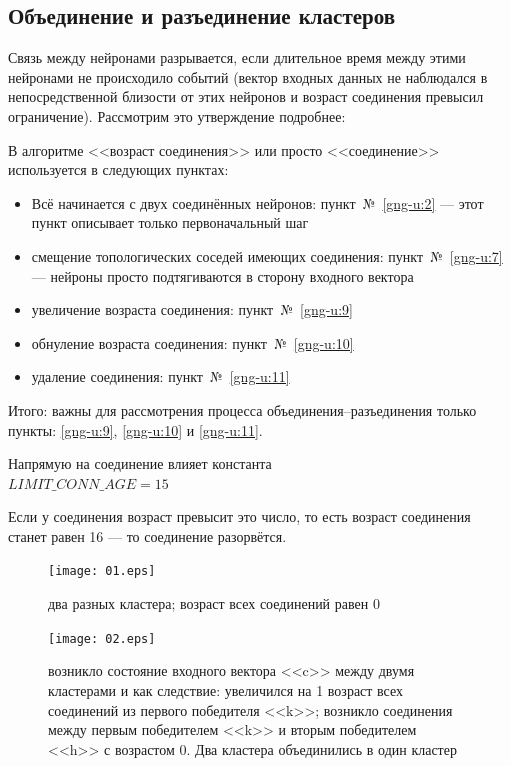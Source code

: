 \documentclass[unicode, 12pt, a4paper,oneside,fleqn]{article}
\begin{document}
\subsection{Объединение и разъединение кластеров}
Связь между нейронами разрывается, если длительное время между этими
нейронами не происходило событий (вектор входных данных не наблюдался
в непосредственной близости от этих нейронов и возраст соединения
превысил ограничение). Рассмотрим это утверждение подробнее:

В алгоритме <<возраст соединения>> или просто <<соединение>>
используется в следующих пунктах:
\begin{itemize}
\item Всё начинается с двух соединённых нейронов: пункт~№~\ref{gng-u:2} ---
  этот пункт описывает только первоначальный шаг
\item смещение топологических соседей имеющих соединения: пункт~№~\ref{gng-u:7}
  --- нейроны просто подтягиваются в сторону входного вектора
\item увеличение возраста соединения: пункт~№~\ref{gng-u:9}
\item обнуление возраста соединения: пункт~№~\ref{gng-u:10}
\item удаление соединения: пункт~№~\ref{gng-u:11}
\end{itemize}
Итого: важны для рассмотрения процесса объединения--разъединения
только пункты: \ref{gng-u:9}, \ref{gng-u:10} и \ref{gng-u:11}.

Напрямую на соединение влияет константа\\
$LIMIT\_CONN\_AGE = 15$

Если у соединения возраст превысит это число, то есть возраст
соединения станет равен 16 --- то соединение разорвётся.

\begin{figure}[h]
  \center
  \texttt{[image: 01.eps]} %
  \caption{два разных кластера; возраст всех соединений равен 0}
  \label{conn-step:01}
\end{figure}

\begin{figure}[h]
  \center
  \texttt{[image: 02.eps]}
  \caption{возникло состояние входного вектора <<c>> между двумя
    кластерами и как следствие: увеличился на 1 возраст всех
    соединений из первого победителя <<k>>; возникло соединения между
    первым победителем <<k>> и вторым победителем <<h>> с возрастом
    0. Два кластера объединились в один кластер}
  \label{conn-step:02}
\end{figure}
\end{document}
